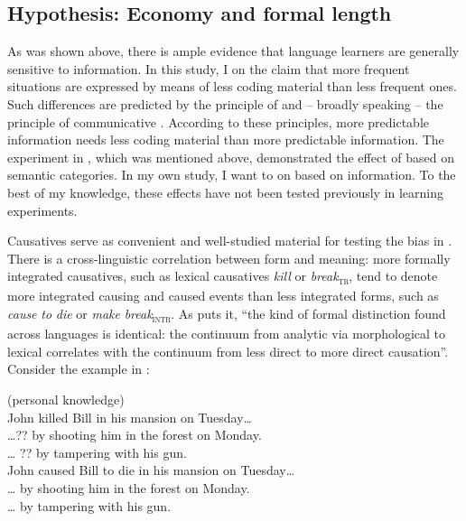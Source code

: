 \documentclass[output=paper]{langsci/langscibook}
\begin{document}
\subsection{Hypothesis: Economy and formal length}

As was shown above, there is ample evidence that language learners are generally sensitive to  information. In this  study, I  on the claim that more frequent situations are expressed by means of less coding material than less frequent ones. Such differences are predicted by the principle of  and – broadly speaking – the principle of communicative . According to these principles, more predictable information needs less coding material than more predictable information. The experiment in \citet{FedzechkinaEtAl2012}, which was mentioned above, demonstrated the effect of  based on semantic categories. In my own study, I want to  on  based on  information. To the best of my knowledge, these effects have not been tested previously in  learning experiments. 

Causatives serve as convenient and well-studied material for testing the bias in . There is a cross-linguistic correlation between form and meaning: more formally integrated causatives, such as lexical causatives \textit{kill} or \textit{break}\textsc{\textsubscript{tr}}, tend to denote more integrated causing and caused events than less integrated forms, such as \textit{cause} \textit{to} \textit{die} or \textit{make} \textit{break}\textsc{\textsubscript{intr}}. As \citet[165]{Comrie1981} puts it, “the kind of formal distinction found across languages is identical: the continuum from analytic via morphological to lexical  correlates with the continuum from less direct to more direct causation”. Consider the example in :

\ea\label{ex:levshina:1}
{ (personal knowledge)}\\ 
  \ea John killed Bill in his mansion on Tuesday… \\
    \ea …?? by shooting him in the forest on Monday.\\
    \ex … ?? by tampering with his gun.\\
    \z
  \ex  John caused Bill to die in his mansion on Tuesday…\\
    \ea … by shooting him in the forest on Monday.\\
    \ex … by tampering with his gun.\\
    \z
  \z
\z
\end{document}
